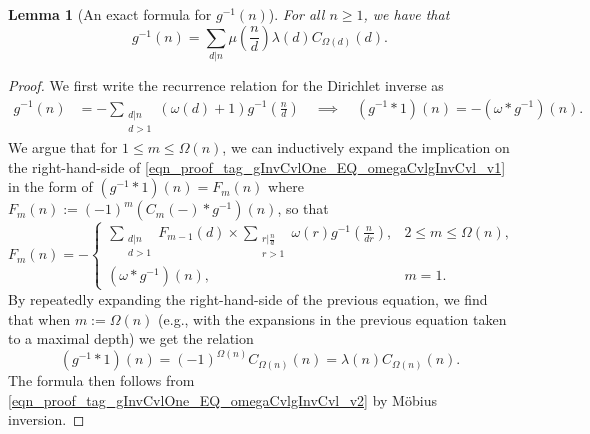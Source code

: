 \documentclass[11pt,reqno,a4letter]{article}
\numberwithin{figure}{section}
\numberwithin{table}{section}
\theoremstyle{plain}
\newtheorem{lemma}[theorem]{Lemma}
\numberwithin{theorem}{section}
\theoremstyle{definition}
\begin{document}
\begin{lemma}[An exact formula for $g^{-1}(n)$] 
\label{lemma_AnExactFormulaFor_gInvByMobiusInv_v1} 
For all $n \geq 1$, we have that 
\[
g^{-1}(n) = \sum_{d|n} \mu\left(\frac{n}{d}\right) \lambda(d) C_{\Omega(d)}(d). 
\]
\end{lemma}
\begin{proof} 
We first write the recurrence relation for the Dirichlet inverse as 
\begin{align} 
\label{eqn_proof_tag_gInvCvlOne_EQ_omegaCvlgInvCvl_v1} 
g^{-1}(n) & = - \sum_{\substack{d|n \\ d>1}} (\omega(d) + 1) g^{-1}\left(\frac{n}{d}\right) 
     \quad\implies\quad 
     (g^{-1} \ast 1)(n) = -(\omega \ast g^{-1})(n). 
\end{align} 
We argue that for $1 \leq m \leq \Omega(n)$, we can inductively expand the 
implication on the right-hand-side of \eqref{eqn_proof_tag_gInvCvlOne_EQ_omegaCvlgInvCvl_v1} 
in the form of $(g^{-1} \ast 1)(n) = F_m(n)$ where 
$F_m(n) := (-1)^{m} (C_m(-) \ast g^{-1})(n)$, so that 
\[
F_m(n) = - 
     \begin{cases} 
     \sum\limits_{\substack{d|n \\ d > 1}} F_{m-1}(d) \times \sum\limits_{\substack{r|\frac{n}{d} \\ r > 1}} 
     \omega(r) g^{-1}\left(\frac{n}{dr}\right), & 2 \leq m \leq \Omega(n), \\ 
     (\omega \ast g^{-1})(n), & m = 1. 
     \end{cases} 
\]
By repeatedly expanding the right-hand-side of the previous equation, 
we find that when $m := \Omega(n)$ (e.g., with the expansions 
in the previous equation taken to a maximal depth) we get the relation 
\begin{equation} 
\label{eqn_proof_tag_gInvCvlOne_EQ_omegaCvlgInvCvl_v2} 
(g^{-1} \ast 1)(n) = (-1)^{\Omega(n)} C_{\Omega(n)}(n) = \lambda(n) C_{\Omega(n)}(n). 
\end{equation} 
The formula then follows from \eqref{eqn_proof_tag_gInvCvlOne_EQ_omegaCvlgInvCvl_v2} 
by M\"obius inversion. 
\end{proof} 
\end{document}
